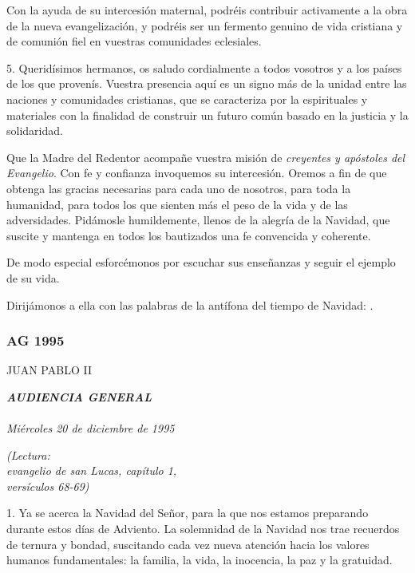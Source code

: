 Con la ayuda de su intercesión maternal, podréis contribuir activamente a la obra de la nueva evangelización, y podréis ser un fermento genuino de vida cristiana y de comunión fiel en vuestras comunidades eclesiales.

5. Queridísimos hermanos, os saludo cordialmente a todos vosotros y a los países de los que provenís. Vuestra presencia aquí es un signo más de la unidad entre las naciones y comunidades cristianas, que se caracteriza por la  espirituales y materiales con la finalidad de construir un futuro común basado en la justicia y la solidaridad.

Que la Madre del Redentor acompañe vuestra misión de \emph{creyentes y apóstoles del Evangelio}. Con fe y confianza invoquemos su intercesión. Oremos a fin de que obtenga las gracias necesarias para cada uno de nosotros, para toda la humanidad, para todos los que sienten más el peso de la vida y de las adversidades. Pidámosle humildemente, llenos de la alegría de la Navidad, que suscite y mantenga en todos los bautizados una fe convencida y coherente.

De modo especial esforcémonos por escuchar sus enseñanzas y seguir el ejemplo de su vida.

Dirijámonos a ella con las palabras de la antífona del tiempo de Navidad: .

\subsubsection{AG 1995} JUAN PABLO II

\textbf{\emph{AUDIENCIA GENERAL\\ }}\\ \emph{Miércoles 20 de diciembre de 1995}

 

\emph{(Lectura:\\ evangelio de san Lucas, capítulo 1,\\ versículos 68-69)}

1. Ya se acerca la Navidad del Señor, para la que nos estamos preparando durante estos días de Adviento. La solemnidad de la Navidad nos trae recuerdos de ternura y bondad, suscitando cada vez nueva atención hacia los valores humanos fundamentales: la familia, la vida, la inocencia, la paz y la gratuidad.

